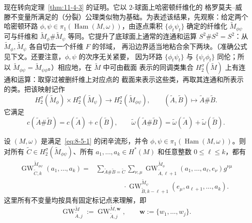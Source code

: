 现在转向定理~\ref{thm:11-4-3} 的证明。它以 $2$-球面上哈密顿纤维化的
格罗莫夫--威滕不变量所满足的（分裂）公理类似物为基础。为表述该结果，先观察：给定两个
哈密顿环路 $\phi,\psi\in\pi_1(\operatorname{Ham}(M,\omega))$，由逐点乘积
$\{\phi_t\psi_t\}$ 确定的纤维化 $\widetilde M_{\phi\psi}$ 可与纤维和
$\widetilde M_\phi\#\widetilde M_\psi$ 等同。它提升了底球面上通常的连通和运算
$S^2\#S^2=S^2$：从 $\widetilde M_\phi,\widetilde M_\psi$ 各自切去一个纤维 $F$ 的邻域，
再沿边界适当地粘合余下两块。（准确公式见下文。还要注意，$\phi,\psi$ 的次序无关紧要，
因为环路 $\{\phi_t\psi_t\}$ 与 $\{\psi_t\phi_t\}$ 同伦；所以
$\widetilde M_{\phi\psi}=\widetilde M_{\psi\phi}$。）相应地，在 $\widetilde M$ 中可由截面
表示的同调类集合 $H_2^\sigma(\widetilde M)$ 上有连通和运算：取穿过被删纤维上对应点的
截面来表示这些类，再取其连通和所表示的类。把该映射记作
\[
  H_2^\sigma(\widetilde M_\phi)\times
  H_2^\sigma(\widetilde M_\psi)
  \longrightarrow H_2^\sigma(\widetilde M_{\phi\psi}),
  \qquad
  (\widetilde A,\widetilde B)\longmapsto\widetilde A\#\widetilde B.
\]
它满足
\begin{equation}\label{eq:11-4-5}
  c(\widetilde A\#\widetilde B)=c(\widetilde A)+c(\widetilde B),
  \qquad
  \widetilde\omega(\widetilde A\#\widetilde B)
  =\widetilde\omega(\widetilde A)+\widetilde\omega(\widetilde B).
\end{equation}

\begin{theorem}\label{thm:11-4-6}
设 $(M,\omega)$ 是满足~\eqref{eq:8-5-1} 的闭辛流形，并令
$\phi,\psi\in\pi_1(\operatorname{Ham}(M,\omega))$。则对所有
$\widetilde C\in H_2^\sigma(\widetilde M_{\phi\psi})$、所有
$a_1,\ldots,a_k\in H^*(M)$ 和任意整数 $0\le\ell\le k$，都有
\[
\begin{aligned}
  \operatorname{GW}^{\widetilde M_{\phi\psi}}_{\widetilde C,k}
  (a_1,\ldots,a_k)
  ={}&\sum_{\widetilde A\#\widetilde B=\widetilde C}
  \sum_{\nu,\mu}
  \operatorname{GW}^{\widetilde M_\phi}_{\widetilde A,\ell+1}
  (a_1,\ldots,a_\ell,e_\nu)g^{\nu\mu}\\
  &\qquad\qquad\cdot
  \operatorname{GW}^{\widetilde M_\psi}_{\widetilde B,k-\ell+1}
  (e_\mu,a_{\ell+1},\ldots,a_k).
\end{aligned}
\]
这里所有不变量均按具有固定标记点来理解，即
\[
  \operatorname{GW}^{\widetilde M}_{\widetilde A,j}
  :=\operatorname{GW}^{\widetilde M,\mathbf w}_{\widetilde A,j},
  \qquad \mathbf w:=\{w_1,\ldots,w_j\}.
\]
\end{theorem}

